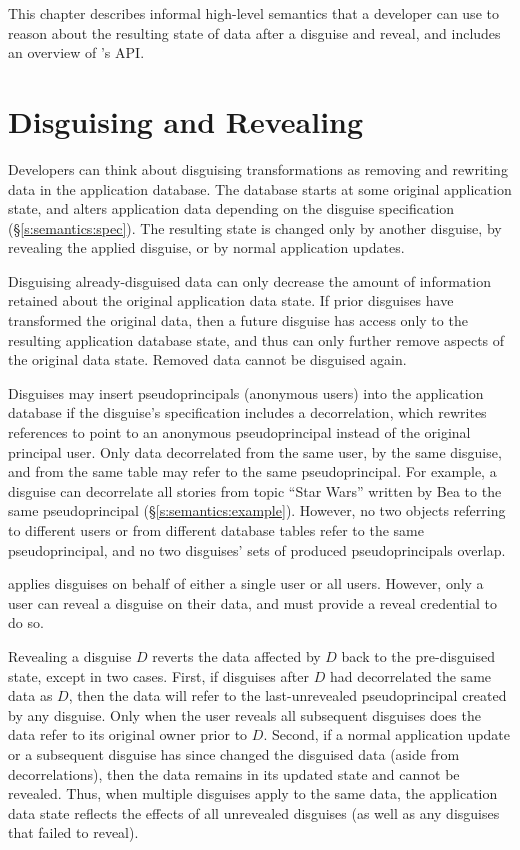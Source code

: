 This chapter describes informal high-level semantics that a developer can use to
reason about the resulting state of data after a disguise and reveal, and 
includes an overview of \sys's API.

\section{Disguising and Revealing}
\label{s:semantics:hl}
Developers can think about disguising transformations as removing and rewriting
data in the application database.
%
The database starts at some original application state, and \sys alters
application data depending on the disguise specification
(\S\ref{s:semantics:spec}).  The resulting state is changed only by another
disguise, by revealing the applied disguise, or by normal application updates.
%

%
Disguising already-disguised data can only decrease the amount of information
retained about the original application data state. If prior disguises have
transformed the original data, then a future disguise has access only to the
resulting application database state, and thus can only further remove aspects
of the original data state.
%
Removed data cannot be disguised again. 
%

Disguises may insert pseudoprincipals (anonymous users) into the application
database if the disguise's specification includes a decorrelation, which
rewrites references to point to an anonymous pseudoprincipal instead of the
original principal user. 
%
Only data decorrelated from the same user, by the same disguise, and from the
same table may refer to the same pseudoprincipal.
%
For example, a disguise can decorrelate all stories from topic ``Star Wars''
written by Bea to the same pseudoprincipal (\S\ref{s:semantics:example}).
%
However, no two objects referring to different users or from different database
tables refer to the same pseudoprincipal, and no two disguises' sets of produced
pseudoprincipals overlap.
%

%
\sys applies disguises on behalf of either a single user or all users. However,
only a user can reveal a disguise on their data, and must provide a reveal
credential to do so.
%

%
Revealing a disguise $D$ reverts the data affected by $D$ back to the
pre-disguised state, except in two cases.  
%
First, if disguises after $D$ had decorrelated the same data as $D$, then
the data will refer to the last-unrevealed pseudoprincipal created by any
disguise.
%
Only when the user reveals all subsequent disguises does the data refer to its
original owner prior to $D$.
%
Second, if a normal application update or a subsequent disguise has since
changed the disguised data (aside from decorrelations), then the data remains in
its updated state and cannot be revealed.
%
%
Thus, when multiple disguises apply to the same data, the application data state
reflects the effects of all unrevealed disguises (as well as any disguises that
\sys failed to reveal).
%

